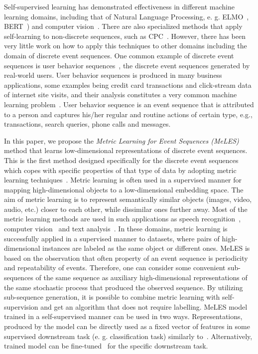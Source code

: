 \documentclass{article}
\begin{document}
Self-supervised learning has demonstrated effectiveness in different machine learning domains, including that of Natural Language Processing, e. g. ELMO~\cite{Peters2018DeepCW}, BERT~\cite{Devlin2019BERTPO}) and computer vision~\cite{Doersch2015UnsupervisedVR}. There are also specialized methods that apply self-learning to non-discrete sequences, such as CPC~\cite{Oord2018RepresentationLW}. However, there has been very little work on how to apply this techniques to other domains including the domain of discrete event sequences. One common example of discrete event sequences is user behavior sequences~\cite{Ni2018PerceiveYU}, the discrete event sequences generated by real-world users. User behavior sequences is produced in many business applications, some examples being credit card transactions and click-stream data of internet site visits, and their analysis constitutes a very common machine learning problem~\cite{Laxman2008StreamPU, Wiese2009CreditCT, Zhang2017CreditRA, Bigon2019PredictionIV}. User behavior sequence is an event sequence that is attributed to a person and captures his/her regular and routine actions of certain type, e.g., transactions, search queries, phone calls and messages.


In this paper, we propose the \emph{Metric Learning for Event Sequences (MeLES)} method that learns low-dimensional representations of discrete event sequences. This is the first method designed specifically for the discrete event sequences which copes with specific properties of that type of data by 
adopting metric learning techniques~\cite{Xing2002DistanceML, Hadsell2006DimensionalityRB}. Metric learning is often used in a supervised manner for mapping high-dimensional objects to a low-dimensional embedding space. The aim of metric learning is to represent semantically similar objects (images, video, audio, etc.) closer to each other, while dissimilar ones further away. Most of the metric learning methods are used in such applications as speech recognition~\cite{Wan2018GeneralizedEL}, computer vision~\cite{Schroff2015FaceNetAU, Mao2019MetricLF} and text analysis~\cite{Reimers2019SentenceBERTSE}. In these domains, metric learning is successfully applied in a supervised manner to datasets, where pairs of high-dimensional instances are labeled as the same object or different ones.
MeLES is based on the observation that often property of an event sequence is periodicity and repeatability of events. Therefore, one can consider some convenient sub-sequences of the same sequence as auxiliary high-dimensional representations of the same stochastic process that produced the observed sequence. By utilizing sub-sequence generation, it is possible to combine metric learning with self-supervision and get an algorithm that does not require labelling.
MeLES model trained in a self-supervised manner can be used in two ways. Representations, produced by the model can be directly used as a fixed vector of features in some supervised downstream task (e. g. classification task) similarly to~\cite{Mikolov2013EfficientEO, Song2017LearningUE, Zhai2019LearningAU}. Alternatively, trained model can be fine-tuned~\cite{Devlin2019BERTPO} for the specific downstream task.
\end{document}
